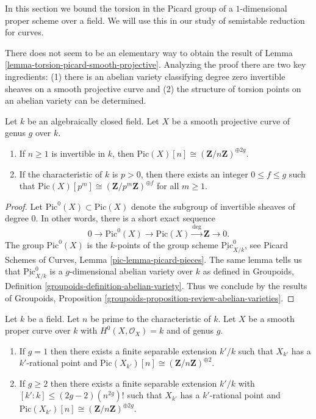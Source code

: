 \noindent
In this section we bound the torsion in the Picard group of a $1$-dimensional
proper scheme over a field. We will use this in our
study of semistable reduction for curves.

\medskip\noindent
There does not seem to be an elementary way to obtain the result of
Lemma \ref{lemma-torsion-picard-smooth-projective}.
Analyzing the proof there are two key ingredients:
(1) there is an abelian variety classifying degree zero invertible sheaves on
a smooth projective curve and (2) the structure of torsion points on
an abelian variety can be determined.

\begin{lemma}
\label{lemma-torsion-picard-smooth-projective}
Let $k$ be an algebraically closed field.
Let $X$ be a smooth projective curve of genus $g$ over $k$.
\begin{enumerate}
\item If $n \geq 1$ is invertible in $k$, then
$\text{Pic}(X)[n] \cong (\mathbf{Z}/n\mathbf{Z})^{\oplus 2g}$.
\item If the characteristic of $k$ is $p > 0$, then there exists
an integer $0 \leq f \leq g$ such that
$\text{Pic}(X)[p^m] \cong (\mathbf{Z}/p^m\mathbf{Z})^{\oplus f}$ for
all $m \geq 1$.
\end{enumerate}
\end{lemma}

\begin{proof}
Let $\text{Pic}^0(X) \subset \text{Pic}(X)$
denote the subgroup of invertible sheaves of degree $0$.
In other words, there is a short exact sequence
$$
0 \to \text{Pic}^0(X) \to \text{Pic}(X) \xrightarrow{\deg} \mathbf{Z} \to 0.
$$
The group $\text{Pic}^0(X)$ is the $k$-points of
the group scheme $\underline{\text{Pic}}^0_{X/k}$, see
Picard Schemes of Curves, Lemma \ref{pic-lemma-picard-pieces}.
The same lemma tells us that $\underline{\text{Pic}}^0_{X/k}$
is a $g$-dimensional abelian variety over $k$ as defined in
Groupoids, Definition \ref{groupoids-definition-abelian-variety}.
Thus we conclude by the results of
Groupoids, Proposition \ref{groupoids-proposition-review-abelian-varieties}.
\end{proof}

\begin{lemma}
\label{lemma-torsion-picard-becomes-visible}
Let $k$ be a field. Let $n$ be prime to the characteristic of $k$.
Let $X$ be a smooth proper curve over $k$ with $H^0(X, \mathcal{O}_X) = k$
and of genus $g$.
\begin{enumerate}
\item If $g = 1$ then there exists a finite separable extension
$k'/k$ such that $X_{k'}$ has a $k'$-rational point and
$\text{Pic}(X_{k'})[n] \cong (\mathbf{Z}/n\mathbf{Z})^{\oplus 2}$.
\item If $g \geq 2$ then there exists a finite separable extension
$k'/k$ with $[k' : k] \leq (2g - 2)(n^{2g})!$
such that $X_{k'}$ has a $k'$-rational point and
$\text{Pic}(X_{k'})[n] \cong (\mathbf{Z}/n\mathbf{Z})^{\oplus 2g}$.
\end{enumerate}
\end{lemma}


